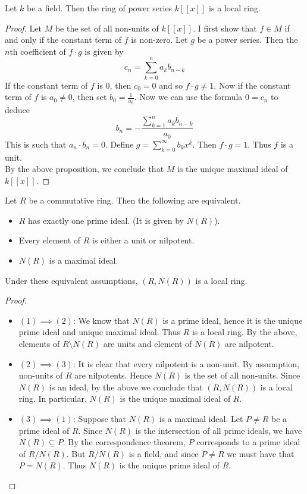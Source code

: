 \documentclass[a4paper]{article}
\begin{document}
\begin{eg}{}{} Let $k$ be a field. Then the ring of power series $k[[x]]$ is a local ring. 
\begin{proof}
Let $M$ be the set of all non-units of $k[[x]]$. I first show that $f\in M$ if and only if the constant term of $f$ is non-zero. Let $g$ be a power series. Then the $n$th coefficient of $f\cdot g$ is given by $$c_n=\sum_{k=0}^na_kb_{n-k}$$ If the constant term of $f$ is $0$, then $c_0=0$ and so $f\cdot g\neq 1$. Now if the constant term of $f$ is $a_0\neq 0$, then set $b_0=\frac{1}{a_0}$. Now we can use the formula $0=c_n$ to deduce $$b_n=-\frac{\sum_{k=1}^na_kb_{n-k}}{a_0}$$ This is such that $a_n\cdot b_n=0$. Define $g=\sum_{k=0}^\infty b_kx^k$. Then $f\cdot g=1$. Thus $f$ is a unit. \\

By the above proposition, we conclude that $M$ is the unique maximal ideal of $k[[x]]$. 
\end{proof}
\end{eg}

\begin{prp}{}{} Let $R$ be a commutative ring. Then the following are equivalent. 
\begin{itemize}
\item $R$ has exactly one prime ideal. (It is given by $N(R)$).
\item Every element of $R$ is either a unit or nilpotent. 
\item $N(R)$ is a maximal ideal. 
\end{itemize}
Under these equivalent assumptions, $(R,N(R))$ is a local ring. 
\begin{proof}~\\
\begin{itemize}
\item $(1)\implies(2)$: We know that $N(R)$ is a prime ideal, hence it is the unique prime ideal and unique maximal ideal. Thus $R$ is a local ring. By the above, elements of $R\setminus N(R)$ are units and element of $N(R)$ are nilpotent. 
\item $(2)\implies(3)$: It is clear that every nilpotent is a non-unit. By assumption, non-units of $R$ are nilpotents. Hence $N(R)$ is the set of all non-units. Since $N(R)$ is an ideal, by the above we conclude that $(R,N(R))$ is a local ring. In particular, $N(R)$ is the unique maximal ideal of $R$. 
\item $(3)\implies(1)$: Suppose that $N(R)$ is a maximal ideal. Let $P\neq R$ be a prime ideal of $R$. Since $N(R)$ is the intersection of all prime ideals, we have $N(R)\subseteq P$. By the correspondence theorem, $P$ corresponds to a prime ideal of $R/N(R)$. But $R/N(R)$ is a field, and since $P\neq R$ we must have that $P=N(R)$. Thus $N(R)$ is the unique prime ideal of $R$. 
\end{itemize}
\end{proof}
\end{prp}
\end{document}
